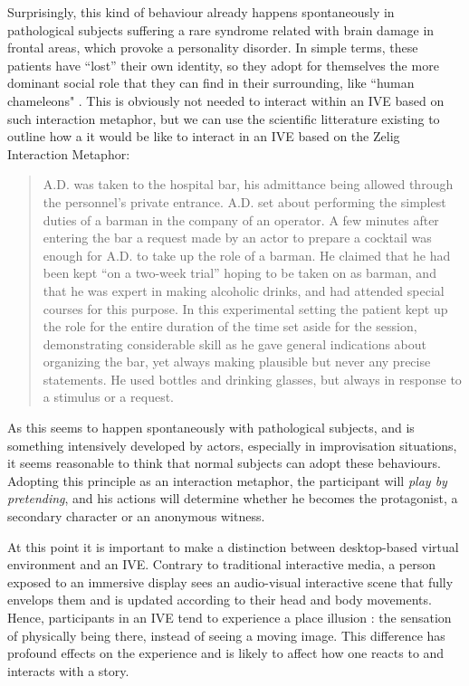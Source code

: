\documentclass[
		twoside,openright,titlepage,numbers=noenddot,manychapters,
		headinclude,%
                footinclude=false,cleardoublepage=empty,
                BCOR=5mm,
		fontsize=11pt, %
                 enabledeprecatedfontcommands]{scrreprt}
\begin{document}
Surprisingly, this kind of behaviour already happens spontaneously in pathological subjects suffering a rare syndrome related with brain damage in frontal areas, which provoke a personality disorder. In simple terms, these patients have ``lost'' their own identity, so they adopt for themselves the more dominant social role that they can find in their surrounding, like ``human chameleons" \cite[]{conchiglia2007peculiar}. This is obviously not needed to interact within an IVE based on such interaction metaphor, but we can use the scientific litterature existing to outline how a it would be like to interact in an IVE based on the Zelig Interaction Metaphor:
\begin{quote}
A.D. was taken to the hospital bar, his admittance being allowed through the personnel’s private entrance. A.D. set about performing the simplest duties of a barman in the company of an operator. A few minutes after entering the bar a request made by an actor to prepare a cocktail was enough for A.D. to take up the role of a barman. He claimed that he had been kept “on a two-week trial” hoping to be taken on as barman, and that he was expert in making alcoholic drinks, and had attended special courses for this purpose. In this experimental setting the patient kept up the role for the entire duration of the time set aside for the session, demonstrating considerable skill as he gave general indications about organizing the bar, yet always making plausible but never any precise statements. He used bottles and drinking glasses, but always in response to a stimulus or a request.
\end{quote}


As this seems to happen spontaneously with pathological subjects, and is something intensively developed by actors, especially in improvisation situations, it seems reasonable to think that normal subjects can adopt these behaviours. Adopting this principle as an interaction metaphor, the participant will \emph{play by pretending}, and his actions will determine whether he becomes the protagonist, a secondary character or an anonymous witness. 


At this point it is important to make a distinction between desktop-based virtual environment and an IVE. Contrary to traditional interactive media, a person exposed to an immersive display sees an audio-visual interactive scene that fully envelops them and is updated according to their head and body movements. Hence, participants in an IVE tend to experience a place illusion \cite[]{slater2009}: the sensation of physically being there, instead of seeing a moving image. This difference has profound effects on the experience and is likely to affect how one reacts to and interacts with a story.
\end{document}
